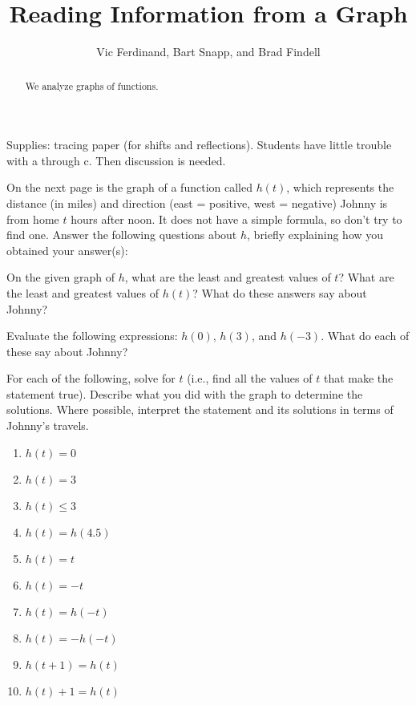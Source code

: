 \documentclass[nooutcomes]{ximera}
\title{Reading Information from a Graph}
\author{Vic Ferdinand, Bart Snapp, and Brad Findell}
\begin{document}
\begin{abstract}
  We analyze graphs of functions.
\end{abstract}
\maketitle


\begin{teachingnote}
Supplies:  tracing paper (for shifts and reflections).  
Students have little trouble with a through c.  Then discussion is needed. 
\end{teachingnote}

On the next page is the graph of a function called $h(t)$, which
represents the distance (in miles) and direction (east = positive,
west = negative) Johnny is from home $t$ hours after noon. It does not
have a simple formula, so don't try to find one. Answer the following
questions about $h$, briefly explaining how you obtained your
answer(s):

\begin{problem}
On the given graph of $h$, what are the least and greatest values
of $t$? What are the least and greatest values of $h(t)$? What do
these answers say about Johnny?
\end{problem}

\begin{problem}
Evaluate the following expressions: $h(0)$, $h(3)$, and $h(-3)$. What
do each of these say about Johnny? 
\end{problem}

\begin{problem}
For each of the following, solve for $t$ (i.e., find all the values of
$t$ that make the statement true). Describe what you did with the
graph to determine the solutions.  Where possible, interpret
the statement and its solutions in terms of Johnny's travels.

\begin{enumerate}
\item $h(t) = 0$
\item $h(t) = 3$
\item $h(t) \leq 3$
\item $h(t) = h(4.5)$
\item $h(t) = t$
\item $h(t) = -t$
\item $h(t) = h(-t)$
\item $h(t) = -h(-t)$
\item $h(t+1) = h(t)$
\item $h(t)+1 = h(t)$
\end{enumerate}
\end{problem}

\newpage


\end{document}
